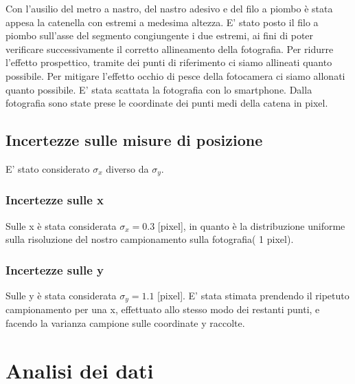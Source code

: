 \documentclass{article}
\begin{document}
Con l'ausilio del metro a nastro, del nastro adesivo e del filo a piombo è  stata appesa la catenella con estremi a medesima altezza.
E' stato posto il filo a piombo sull'asse del segmento congiungente i due estremi, ai fini di poter verificare successivamente il corretto allineamento della fotografia.
Per ridurre l'effetto prospettico, tramite dei punti di riferimento ci siamo allineati quanto possibile.
Per mitigare l'effetto occhio di pesce della fotocamera ci siamo allonati quanto possibile.
E' stata scattata la fotografia con lo smartphone.
Dalla fotografia sono state prese le coordinate dei punti medi della catena in pixel.

\subsection{Incertezze sulle misure di posizione}
E' stato considerato  $\sigma_x$ diverso da $\sigma_y$.

\subsubsection{Incertezze sulle x}
Sulle x è stata considerata  $\sigma_x= 0.3$ [pixel], in quanto è la distribuzione uniforme sulla risoluzione del nostro campionamento sulla fotografia( 1 pixel). 

\subsubsection{Incertezze sulle y}
Sulle y è stata considerata  $\sigma_y= 1.1$ [pixel].
E' stata stimata prendendo il ripetuto campionamento per una x, effettuato allo stesso modo dei restanti punti, e facendo la varianza campione sulle coordinate y raccolte.


\section{Analisi dei dati}
\end{document}
